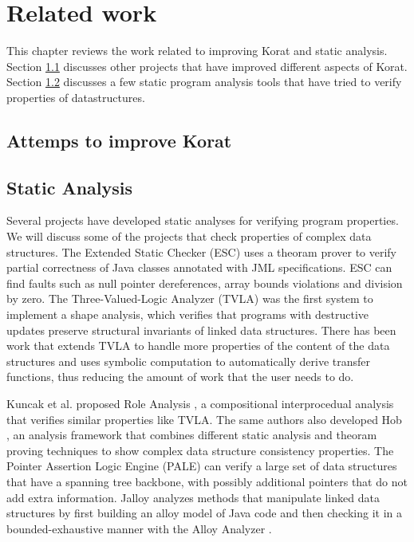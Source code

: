 \chapter{Related work}
\label{ch:related-work}
This chapter reviews the work related to improving Korat and static analysis. Section \ref{sec:attempts-to-improve-korat} discusses other projects that have improved different aspects of Korat. Section \ref{sec:related-static-analyses} discusses a few static program analysis tools that have tried to verify properties of datastructures.

\section{Attemps to improve Korat}
\label{sec:attempts-to-improve-korat}

\section{Static Analysis}
\label{sec:related-static-analyses}
Several projects have developed static analyses for verifying program
properties. We will discuss some of the projects that check properties
of complex data structures. The Extended Static Checker (ESC)
\cite{flanagan2002extended} uses a theoram prover to verify partial correctness of Java
classes annotated with JML specifications. ESC can find faults such as
null pointer dereferences, array bounds violations and division by
zero. The Three-Valued-Logic Analyzer (TVLA) \cite{sagiv2002parametric} was the first
system to implement a shape analysis, which verifies that programs
with destructive updates preserve structural invariants of linked data
structures. There has been work \cite{yorsh2004symbolically}  that extends TVLA to
handle more properties of the content of the data structures and uses
symbolic computation to automatically derive transfer functions, thus
reducing the amount of work that the user needs to do.

\para Kuncak et al. proposed Role Analysis \cite{kuncak2002role}, a compositional
interprocedual analysis that verifies similar properties like
TVLA. The same authors also developed Hob \cite{lam2005generalized}, an analysis
framework that combines different static analysis and theoram proving
techniques \cite{zee2004combining} to show complex data structure consistency
properties. The Pointer Assertion Logic Engine (PALE) \cite{moller2001pointer} can
verify a large set of data structures that have a spanning tree
backbone, with possibly additional pointers that do not add extra
information. Jalloy \cite{jackson2000finding,vaziri2003checking} analyzes methods that manipulate linked data
structures by first building an alloy model of Java code and then
checking it in a bounded-exhaustive manner with the Alloy Analyzer
\cite{jackson2000alcoa}.


